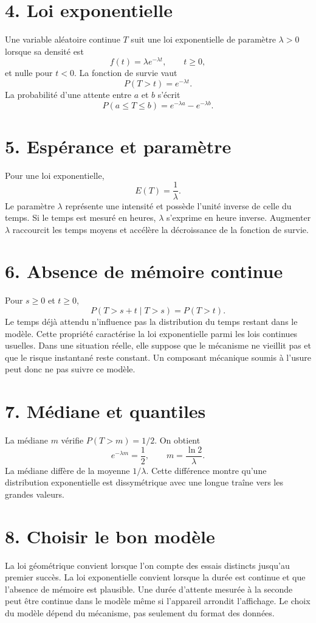 \section{4. Loi exponentielle}
Une variable aléatoire continue $T$ suit une loi exponentielle de paramètre $\lambda>0$ lorsque sa densité est
\[
f(t)=\lambda e^{-\lambda t},\qquad t\geq0,
\]
et nulle pour $t<0$. La fonction de survie vaut
\[
P(T>t)=e^{-\lambda t}.
\]
La probabilité d'une attente entre $a$ et $b$ s'écrit
\[
P(a\leq T\leq b)=e^{-\lambda a}-e^{-\lambda b}.
\]
\section{5. Espérance et paramètre}
Pour une loi exponentielle,
\[
E(T)=\frac1\lambda.
\]
Le paramètre $\lambda$ représente une intensité et possède l'unité inverse de celle du temps. Si le temps est mesuré en heures, $\lambda$ s'exprime en heure inverse.
Augmenter $\lambda$ raccourcit les temps moyens et accélère la décroissance de la fonction de survie.
\section{6. Absence de mémoire continue}
Pour $s\geq0$ et $t\geq0$,
\[
P(T>s+t\mid T>s)=P(T>t).
\]
Le temps déjà attendu n'influence pas la distribution du temps restant dans le modèle. Cette propriété caractérise la loi exponentielle parmi les lois continues usuelles.
Dans une situation réelle, elle suppose que le mécanisme ne vieillit pas et que le risque instantané reste constant. Un composant mécanique soumis à l'usure peut donc ne pas suivre ce modèle.
\section{7. Médiane et quantiles}
La médiane $m$ vérifie $P(T>m)=1/2$. On obtient
\[
e^{-\lambda m}=\frac12,
\qquad
m=\frac{\ln2}{\lambda}.
\]
La médiane diffère de la moyenne $1/\lambda$. Cette différence montre qu'une distribution exponentielle est dissymétrique avec une longue traîne vers les grandes valeurs.
\section{8. Choisir le bon modèle}
La loi géométrique convient lorsque l'on compte des essais distincts jusqu'au premier succès. La loi exponentielle convient lorsque la durée est continue et que l'absence de mémoire est plausible.
Une durée d'attente mesurée à la seconde peut être continue dans le modèle même si l'appareil arrondit l'affichage. Le choix du modèle dépend du mécanisme, pas seulement du format des données.
